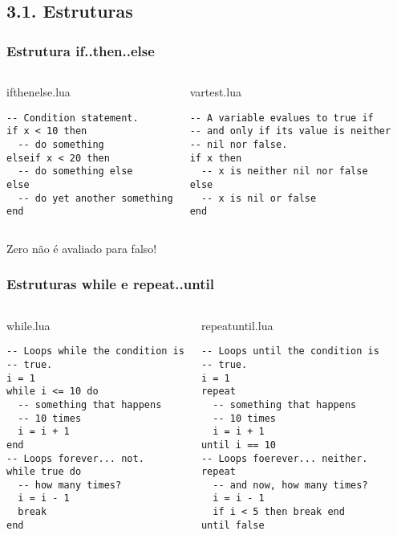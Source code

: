 \documentclass[brazil]{beamer}
\begin{document}
\subsection{3.1. Estruturas}
\begin{frame}[fragile]
  \frametitle{Estrutura if..then..else }
  \pause
  \begin{columns}
      \begin{block}{ifthenelse.lua}
        \begin{lstlisting}
-- Condition statement.
if x < 10 then
  -- do something
elseif x < 20 then
  -- do something else
else
  -- do yet another something
end 
        \end{lstlisting}
      \end{block}
    \pause
      \begin{block}{vartest.lua}
        \begin{lstlisting}
-- A variable evalues to true if
-- and only if its value is neither
-- nil nor false.
if x then
  -- x is neither nil nor false
else
  -- x is nil or false
end
        \end{lstlisting}
      \end{block}
  \end{columns}
  \pause
  \begin{center}
    Zero não é avaliado para falso!
  \end{center}
\end{frame}
\begin{frame}[fragile]
  \frametitle{Estruturas while e repeat..until}
  \pause
  \begin{columns}
      \begin{block}{while.lua}
        \begin{lstlisting}
-- Loops while the condition is
-- true.
i = 1
while i <= 10 do
  -- something that happens
  -- 10 times
  i = i + 1
end
-- Loops forever... not.
while true do
  -- how many times?
  i = i - 1
  break
end
        \end{lstlisting}
      \end{block}
    \pause
      \begin{block}{repeatuntil.lua}
        \begin{lstlisting}
-- Loops until the condition is
-- true.
i = 1
repeat
  -- something that happens
  -- 10 times
  i = i + 1
until i == 10
-- Loops foerever... neither.
repeat
  -- and now, how many times?
  i = i - 1
  if i < 5 then break end
until false
        \end{lstlisting}
      \end{block}
  \end{columns}
\end{frame}
\end{document}
